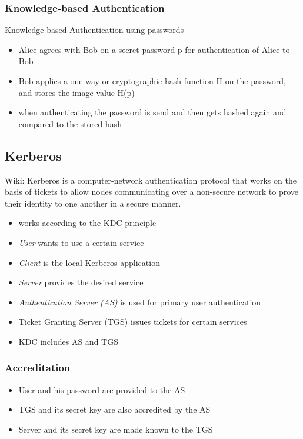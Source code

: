 \documentclass[11pt]{article}
\begin{document}
\subsubsection{Knowledge-based Authentication}
\label{sec:org2b80c77}
Knowledge-based Authentication using passwords
\begin{itemize}
\item Alice agrees with Bob on a secret password p for authentication of Alice to Bob
\item Bob applies a one-way or cryptographic hash function H on the password, and stores the image value H(p)
\item when authenticating the password is send and then gets hashed again and compared to the stored hash
\end{itemize}

\subsection{Kerberos}
\label{sec:org0ac6e8b}
Wiki: Kerberos is a computer-network authentication protocol that works on the basis of tickets to allow nodes communicating over a non-secure network to prove their identity to one another in a secure manner.

\begin{itemize}
\item works according to the KDC principle
\item \emph{User} wants to use a certain service
\item \emph{Client} is the local Kerberos application
\item \emph{Server} provides the desired service
\item \emph{Authentication Server (AS)} is used for primary user authentication
\item Ticket Granting Server (TGS) issues tickets for certain services
\item KDC includes AS and TGS
\end{itemize}

\subsubsection{Accreditation}
\label{sec:orga10948f}
\begin{itemize}
\item User and his password are provided to the AS
\item TGS and its secret key are also accredited by the AS
\item Server and its secret key are made known to the TGS
\end{itemize}
\end{document}
